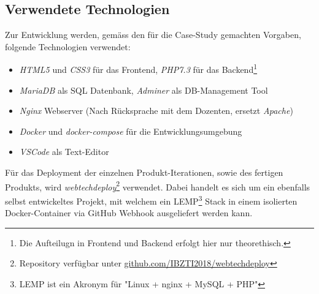 \subsection{Verwendete Technologien}

Zur Entwicklung werden, gemäss den für die Case-Study gemachten Vorgaben, folgende Technologien verwendet:

\begin{itemize}
  \item \emph{HTML5} und \emph{CSS3} für das Frontend, \emph{PHP7.3} für das Backend\footnote{Die Aufteilugn in Frontend und Backend erfolgt hier nur theorethisch.}
  \item \emph{MariaDB} als SQL Datenbank, \emph{Adminer} als DB-Management Tool
  \item \emph{Nginx} Webserver (Nach Rücksprache mit dem Dozenten, ersetzt \emph{Apache})
  \item \emph{Docker} und \emph{docker-compose} für die Entwicklungsumgebung
  \item \emph{VSCode} als Text-Editor
\end{itemize}

\noindent
Für das Deployment der einzelnen Produkt-Iterationen, sowie des fertigen Produkts, wird \emph{webtechdeploy}\footnote{Repository verfügbar unter \href{https://github.com/IBZTI2018/webtechdeploy}{github.com/IBZTI2018/webtechdeploy}} verwendet.
Dabei handelt es sich um ein ebenfalls selbst entwickeltes Projekt, mit welchem ein LEMP\footnote{LEMP ist ein Akronym für "Linux + nginx + MySQL + PHP"} Stack in einem isolierten Docker-Container via GitHub Webhook ausgeliefert werden kann.
